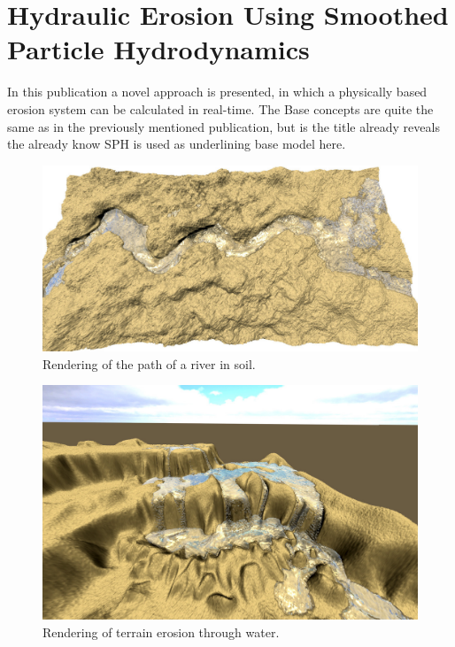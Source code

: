 \section{Hydraulic Erosion Using Smoothed Particle Hydrodynamics}
In this publication \cite{krivstof2009hydraulic} a novel approach is presented, in which a physically based erosion system can be calculated in real-time. The Base concepts are quite the same as in the previously mentioned publication, but is the title already reveals the already know SPH is used as underlining base model here.

\begin{figure}[htb]
	\centering
	\includegraphics[width=\linewidth]{KBKS09/illustration1.jpg}
	\caption{Rendering of the path of a river in soil.}
	\label{fig:illustration1}
\end{figure}


\begin{figure}[htb]
	\centering
	\includegraphics[width=\linewidth]{KBKS09/illustration2.jpg}
	\caption{Rendering of terrain erosion through water.}
	\label{fig:illustration2}
\end{figure}


